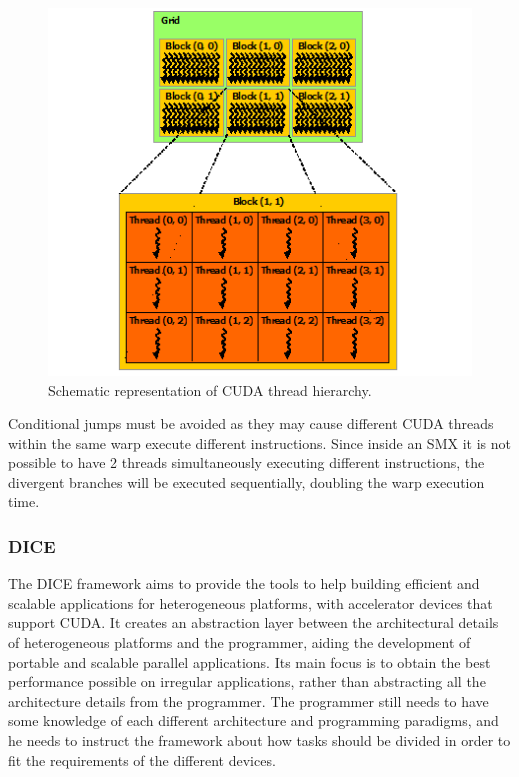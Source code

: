 \begin{figure}[!htp]
	\begin{center}
		\includegraphics[scale=0.9]{imgs/cuda_threads.png}
		\caption{Schematic representation of CUDA thread hierarchy.}
		\label{fig:cuda}
	\end{center}
\end{figure}

Conditional jumps must be avoided as they may cause different CUDA threads within the same warp execute different instructions. Since inside an SMX it is not possible to have 2 threads simultaneously executing different instructions, the divergent branches will be executed sequentially, doubling the warp execution time.

\subsubsection*{DICE}

The DICE framework aims to provide the tools to help building efficient and scalable applications for heterogeneous platforms, with accelerator devices that support CUDA. It creates an abstraction layer between the architectural details of heterogeneous platforms and the programmer, aiding the development of portable and scalable parallel applications. Its main focus is to obtain the best performance possible on irregular applications, rather than abstracting all the architecture details from the programmer. The programmer still needs to have some knowledge of each different architecture and programming paradigms, and he needs to instruct the framework about how tasks should be divided in order to fit the requirements of the different devices. 


